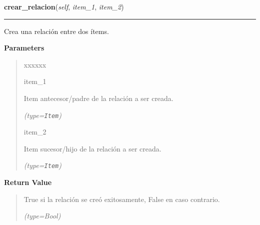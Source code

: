     \vspace{0.5ex}

\hspace{.8\funcindent}\begin{boxedminipage}{\funcwidth}

    \raggedright \textbf{crear\_relacion}(\textit{self}, \textit{item\_1}, \textit{item\_2})

    \vspace{-1.5ex}

    \rule{\textwidth}{0.5\fboxrule}
\setlength{\parskip}{2ex}
    Crea una relación entre dos ítems.

\setlength{\parskip}{1ex}
      \textbf{Parameters}
      \vspace{-1ex}

      \begin{quote}
        \begin{Ventry}{xxxxxx}

          \item[item\_1]

          Item antecesor/padre de la relación a ser creada.

            {\it (type=\texttt{Item})}

          \item[item\_2]

          Item sucesor/hijo de la relación a ser creada.

            {\it (type=\texttt{Item})}

        \end{Ventry}

      \end{quote}

      \textbf{Return Value}
    \vspace{-1ex}

      \begin{quote}
      True si la relación se creó exitosamente, False en caso contrario.

      {\it (type=Bool)}

      \end{quote}

    \end{boxedminipage}

    \label{saip:controllers:version_controller:VersionController:crear_revision}

